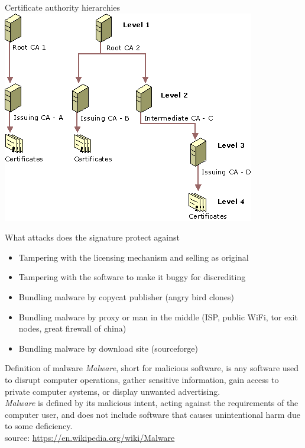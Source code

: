 \documentclass[11pt]{beamer}
\begin{document}
\begin{frame}{Certificate authority hierarchies}
\includegraphics[scale=0.5]{certificate_authority_hierarchies.png}
\end{frame}

\begin{frame}{What attacks does the signature protect against}
\begin{itemize}
\item Tampering with the licensing mechanism and selling as original
\item Tampering with the software to make it buggy for discrediting
\item Bundling malware by copycat publisher (angry bird clones)
\item Bundling malware by proxy or man in the middle (ISP, public WiFi, tor exit nodes, great firewall of china)
\item Bundling malware by download site (sourceforge)
\end{itemize}
\end{frame}

\begin{frame}{Definition of malware}
\emph{Malware}, short for malicious software, is any software used to disrupt computer operations, gather sensitive information, gain access to private computer systems, or display unwanted advertising.
\\[0.2cm]
\emph{Malware} is defined by its malicious intent, acting against the requirements of the computer user, and does not include software that causes unintentional harm due to some deficiency.
\\[0.2cm]
source: \href{https://en.wikipedia.org/wiki/Malware}{https://en.wikipedia.org/wiki/Malware}
\end{frame}
\end{document}
